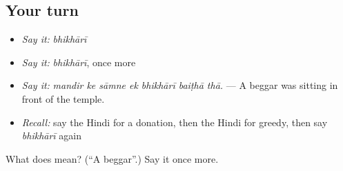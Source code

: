 \subsection*{Your turn}
\begin{itemize}
\raggedright
  \item \emph{Say it:} \emph{bhikhārī}
  \item \emph{Say it:} \emph{bhikhārī}, once more
  \item \emph{Say it:} \emph{mandir ke sāmne ek bhikhārī baiṭhā thā.} — A beggar was sitting in front of the temple.
  \item \emph{Recall:} say the Hindi for a donation, then the Hindi for greedy, then say \emph{bhikhārī} again
\end{itemize}

\begin{tcolorbox}[breakable,colback=teal!4,colframe=teal!35!black,title={Before you move on}]
What does  mean? (\textquotedblleft{}A beggar\textquotedblright{}.) Say it once more.
\end{tcolorbox}
